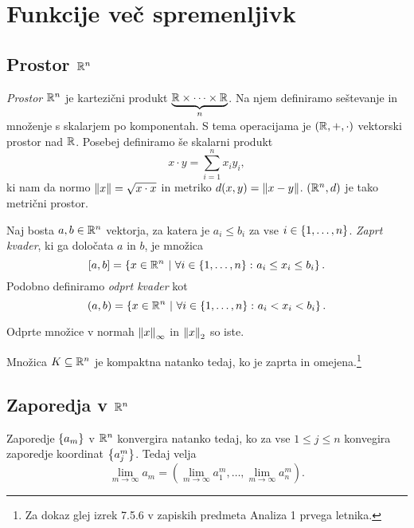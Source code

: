 \section{Funkcije več spremenljivk}

\subsection{Prostor $\mathbb{R}^n$}

\begin{definicija}
\emph{Prostor $\mathbb{R}^n$} je kartezični produkt $\underbrace{\mathbb{R}\times\dots\times\mathbb{R}}_n$. Na njem definiramo seštevanje in množenje s skalarjem po komponentah. S tema operacijama je $(\mathbb{R},+,\cdot)$ vektorski prostor nad $\mathbb{R}$. Posebej definiramo še skalarni produkt
\[
x\cdot y=\sum_{i=1}^n x_iy_i,
\]
ki nam da normo $\left\lVert x\right\rVert=\sqrt{x\cdot x}$ in metriko $d(x,y)=\left\lVert x-y\right\rVert$. $(\mathbb{R}^n,d)$ je tako metrični prostor.
\end{definicija}

\begin{definicija}
Naj bosta $a,b\in\mathbb{R}^n$ vektorja, za katera je $a_i\leq b_i$ za vse $i\in\left\{1,\dots,n\right\}$. \emph{Zaprt kvader}, ki ga določata $a$ in $b$, je množica
\[
[a,b]=\left\{x\in\mathbb{R}^n~\middle\vert~\forall i\in\left\{1,\dots,n\right\}\colon a_i\leq x_i\leq b_i\right\}.
\]
Podobno definiramo \emph{odprt kvader} kot
\[
(a,b)=\left\{x\in\mathbb{R}^n~\middle\vert~\forall i\in\left\{1,\dots,n\right\}\colon a_i<x_i<b_i\right\}.
\]
\end{definicija}

\begin{opomba}
Odprte množice v normah $\left\lVert x\right\rVert_\infty$ in $\left\lVert x\right\rVert_2$ so iste.
\end{opomba}

\begin{izrek}
Množica $K\subseteq\mathbb{R}^n$ je kompaktna natanko tedaj, ko je zaprta in omejena.\footnote{Za dokaz glej izrek 7.5.6 v zapiskih predmeta Analiza 1 prvega letnika.}
\end{izrek}

\newpage

\subsection{Zaporedja v $\mathbb{R}^n$}

\begin{trditev}
Zaporedje $\left\{a_m\right\}$ v $\mathbb{R}^n$ konvergira natanko tedaj, ko za vse $1\leq j\leq n$ konvegira zaporedje koordinat $\left\{a_j^m\right\}$. Tedaj velja
\[
\lim_{m\to\infty} a_m=\left(\lim_{m\to\infty} a_1^m,\dots,\lim_{m\to\infty} a_n^m\right).
\]
\end{trditev}

